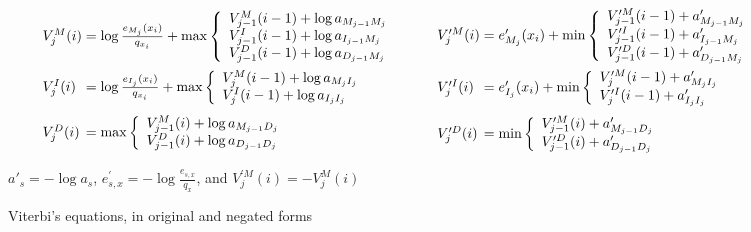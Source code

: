 \documentclass[preprint,nonatbib,blockstyle,nocopyrightspace,times]{sigplanconf}
\begin{document}
\begin{figure}
\def\goo{18pt}
\def\gum{14pt}
\[
\begin{array}{l@{}c@{}l}
V_{j}^{M}(i) &{}={}& \log\frac{e_{M_{j}}(x_{i})}{q_{x_{i}}} + \max \left\{
\begin{array}{l l}
V_{j-1}^{M}(i - 1) + \log a_{M_{j-1}M_{j}}\\
V_{j-1}^{I}(i - 1) + \log a_{I_{j-1}M_{j}}\\
V_{j-1}^{D}(i - 1) + \log a_{D_{j-1}M_{j}}\\
\end{array} \right.\\[\goo]
V_{j}^{I}(i) &=& \log\frac{e_{I_{j}}(x_{i})}{q_{x_{i}}} + \max \left\{
\begin{array}{l l}
V_{j}^{M}(i - 1) + \log a_{M_{j}I_{j}}\\
V_{j}^{I}(i - 1) + \log a_{I_{j}I_{j}}\\
\end{array} \right.\\[\gum]
V_{j}^{D}(i) &=& \max \left\{
\begin{array}{l l}
V_{j-1}^{M}(i) + \log a_{M_{j-1}D_{j}}\\
V_{j-1}^{D}(i) + \log a_{D_{j-1}D_{j}}\\
\end{array} \right.\\
\end{array}
\qquad
\begin{array}{l@{}c@{}l}
V_{j}^{\prime M}(i) &{}={}& e^{\prime}_{M_{j}}(x_{i}) + \min \left\{
\begin{array}{l l}
V_{j-1}^{\prime M}(i - 1) + a^{\prime}_{M_{j-1}M_{j}}\\
V_{j-1}^{\prime I}(i - 1) + a^{\prime}_{I_{j-1}M_{j}}\\
V_{j-1}^{\prime D}(i - 1) + a^{\prime}_{D_{j-1}M_{j}}\\
\end{array} \right.\\[\goo]
V_{j}^{\prime I}(i) &=& e^{\prime}_{I_{j}}(x_{i}) + \min \left\{
\begin{array}{l l}
V_{j}^{\prime M}(i - 1) + a^{\prime}_{M_{j}I_{j}}\\
V_{j}^{\prime I}(i - 1) + a^{\prime}_{I_{j}I_{j}}\\
\end{array} \right.\\[\gum]
V_{j}^{\prime D}(i) &=& \min \left\{
\begin{array}{l l}
V_{j-1}^{\prime M}(i) + a^{\prime}_{M_{j-1}D_{j}}\\
V_{j-1}^{\prime D}(i) + a^{\prime}_{D_{j-1}D_{j}}\\
\end{array} \right.\\
\end{array}
\]

\centerline{$a'_{s} = - \log a_{s} \nonumber$,
$e^{\prime}_{s,x} = - \log\frac{e_{s,x}}{q_{x}}$,
and 
$V_j^{\prime M}(i) = - V_j^{M}(i)$}
\caption{Viterbi's equations, in original and negated forms}
\label{viterbi}
\end{figure}
\end{document}

